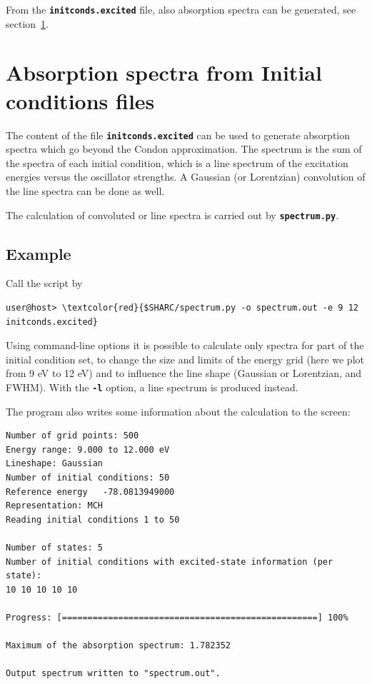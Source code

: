 \documentclass[a4paper,11pt,DIV=15,openany]{scrbook}
\newcommand{\ttt}[1]{\textbf{\texttt{#1}}}
\begin{document}
From the \ttt{initconds.excited} file, also absorption spectra can be generated, see section~\ref{sec:absspec}.




\clearpage
\section{Absorption spectra from Initial conditions files}\label{sec:absspec}

The content of the file \ttt{initconds.excited} can be used to generate absorption spectra which go beyond the Condon approximation. The spectrum is the sum of the spectra of each initial condition, which is a line spectrum of the excitation energies versus the oscillator strengths. A Gaussian (or Lorentzian) convolution of the line spectra can be done as well.

The calculation of convoluted or line spectra is carried out by \ttt{spectrum.py}. 

\subsection{Example}

Call the script by
\begin{Verbatim}[commandchars=\\\{\}]
user@host> \textcolor{red}{$SHARC/spectrum.py -o spectrum.out -e 9 12 initconds.excited}
\end{Verbatim}
Using command-line options it is possible to calculate only spectra for part of the initial condition set, to change the size and limits of the energy grid (here we plot from 9 eV to 12 eV) and to influence the line shape (Gaussian or Lorentzian, and FWHM). With the \ttt{-l} option, a line spectrum is produced instead.

The program also writes some information about the calculation to the screen:
\begin{oframed}
\footnotesize\begin{Verbatim}[commandchars=\\\{\}]
Number of grid points: 500
Energy range: 9.000 to 12.000 eV
Lineshape: Gaussian
Number of initial conditions: 50
Reference energy   -78.0813949000
Representation: MCH
Reading initial conditions 1 to 50

Number of states: 5
Number of initial conditions with excited-state information (per state):
10 10 10 10 10 

Progress: [==================================================] 100%

Maximum of the absorption spectrum: 1.782352

Output spectrum written to "spectrum.out".
\end{Verbatim}
\end{oframed}
\end{document}
